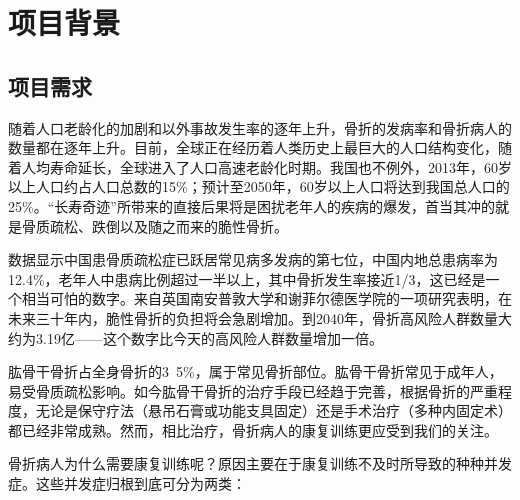 \documentclass[UTF8]{ctexart}
\begin{document}
\section{项目背景}
    \subsection{项目需求}
        随着人口老龄化的加剧和以外事故发生率的逐年上升，骨折的发病率和骨折病人的数量都在逐年上升。目前，全球正在经历着人类历史上最巨大的人口结构变化，随着人均寿命延长，全球进入了人口高速老龄化时期。我国也不例外，2013年，60岁以上人口约占人口总数的15\%；预计至2050年，60岁以上人口将达到我国总人口的25\%。“长寿奇迹”所带来的直接后果将是困扰老年人的疾病的爆发，首当其冲的就是骨质疏松、跌倒以及随之而来的脆性骨折。
        
        数据显示中国患骨质疏松症已跃居常见病多发病的第七位，中国内地总患病率为12.4\%，老年人中患病比例超过一半以上，其中骨折发生率接近1/3，这已经是一个相当可怕的数字。来自英国南安普敦大学和谢菲尔德医学院的一项研究表明，在未来三十年内，脆性骨折的负担将会急剧增加。到2040年，骨折高风险人群数量大约为3.19亿——这个数字比今天的高风险人群数量增加一倍。
        
        肱骨干骨折占全身骨折的3~5\%，属于常见骨折部位。肱骨干骨折常见于成年人，易受骨质疏松影响。如今肱骨干骨折的治疗手段已经趋于完善，根据骨折的严重程度，无论是保守疗法（悬吊石膏或功能支具固定）还是手术治疗（多种内固定术）都已经非常成熟。然而，相比治疗，骨折病人的康复训练更应受到我们的关注。
        
        骨折病人为什么需要康复训练呢？原因主要在于康复训练不及时所导致的种种并发症。这些并发症归根到底可分为两类：
\end{document}
